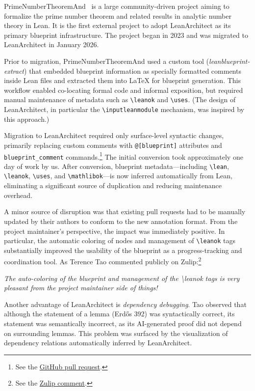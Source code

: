 \documentclass{article}
\newcommand{\leanarchitect}{LeanArchitect\xspace}
\renewenvironment{quote}{\begin{mdframed}[style=quotestyle]\itshape}{\end{mdframed}}
\newcommand\latexcode{\lstinline[language={[latex]tex},keywordstyle=\ttfamily\color{black}]}
\newcommand\bplatexcode{\lstinline[language={[latex]tex},keywordstyle=\ttfamily\color{keywordcolor},moretexcs={inputleannode,inputleanmodule}]}
\newcommand\leancode{\lstinline[language=lean]}
\begin{document}
PrimeNumberTheoremAnd~\cite{kontorovich_pnt} is a large community-driven project aiming to formalize the prime number theorem and related results in analytic number theory in Lean. It is the first external project to adopt \leanarchitect as its primary blueprint infrastructure. The project began in 2023 and was migrated to \leanarchitect in January 2026.

Prior to migration, PrimeNumberTheoremAnd used a custom tool (\emph{leanblueprint-extract}) that embedded blueprint information as specially formatted comments inside Lean files and extracted them into \LaTeX{} for blueprint generation. This workflow enabled co-locating formal code and informal exposition, but required manual maintenance of metadata such as \latexcode{\leanok} and \latexcode{\uses}. (The design of \leanarchitect, in particular the \bplatexcode{\inputleanmodule} mechanism, was inspired by this approach.)

Migration to \leanarchitect required only surface-level syntactic changes, primarily replacing custom comments with \leancode{@[blueprint]} attributes and \leancode{blueprint_comment} commands.\footnote{See the \href{https://github.com/AlexKontorovich/PrimeNumberTheoremAnd/pull/439}{GitHub pull request}.} The initial conversion took approximately one day of work by us. After conversion, blueprint metadata---including \latexcode{\lean}, \latexcode{\leanok}, \latexcode{\uses}, and \latexcode{\mathlibok}---is now inferred automatically from Lean, eliminating a significant source of duplication and reducing maintenance overhead.

A minor source of disruption was that existing pull requests had to be manually updated by their authors to conform to the new annotation format. From the project maintainer's perspective, the impact was immediately positive. In particular, the automatic coloring of nodes and management of \latexcode{\leanok} tags substantially improved the usability of the blueprint as a progress-tracking and coordination tool. As Terence Tao commented publicly on Zulip:\footnote{See the \href{https://leanprover.zulipchat.com/\#narrow/channel/423402-PrimeNumberTheorem.2B/topic/Update.20on.20tertiary.20estimate.20projects/near/567004857}{Zulip comment}.}
\begin{quote}
The auto-coloring of the blueprint and management of the \textbackslash{}leanok tags is very pleasant from the project maintainer side of things!
\end{quote}

Another advantage of \leanarchitect is \emph{dependency debugging}. Tao observed that although the statement of a lemma (Erd\H{o}s 392) was syntactically correct, its statement was semantically incorrect, as its AI-generated proof did not depend on surrounding lemmas. This problem was surfaced by the visualization of dependency relations automatically inferred by \leanarchitect.
\end{document}
